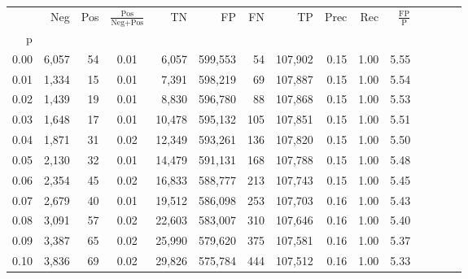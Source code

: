 \begin{tabular}{rrrcrrrrrrrrrrr}
\toprule
{} &     Neg &    Pos & $\frac{\text{Pos}}{\text{Neg}+\text{Pos}}$ &       TN &       FP &       FN &       TP &  Prec &   Rec & $\frac{\text{FP}}{\text{P}}$ \\
p    &         &        &                                            &          &          &          &          &       &       &                              \\
\midrule
0.00 &   6,057 &     54 &                                       0.01 &    6,057 &  599,553 &       54 &  107,902 &  0.15 &  1.00 &                         5.55 \\
0.01 &   1,334 &     15 &                                       0.01 &    7,391 &  598,219 &       69 &  107,887 &  0.15 &  1.00 &                         5.54 \\
0.02 &   1,439 &     19 &                                       0.01 &    8,830 &  596,780 &       88 &  107,868 &  0.15 &  1.00 &                         5.53 \\
0.03 &   1,648 &     17 &                                       0.01 &   10,478 &  595,132 &      105 &  107,851 &  0.15 &  1.00 &                         5.51 \\
0.04 &   1,871 &     31 &                                       0.02 &   12,349 &  593,261 &      136 &  107,820 &  0.15 &  1.00 &                         5.50 \\
0.05 &   2,130 &     32 &                                       0.01 &   14,479 &  591,131 &      168 &  107,788 &  0.15 &  1.00 &                         5.48 \\
0.06 &   2,354 &     45 &                                       0.02 &   16,833 &  588,777 &      213 &  107,743 &  0.15 &  1.00 &                         5.45 \\
0.07 &   2,679 &     40 &                                       0.01 &   19,512 &  586,098 &      253 &  107,703 &  0.16 &  1.00 &                         5.43 \\
0.08 &   3,091 &     57 &                                       0.02 &   22,603 &  583,007 &      310 &  107,646 &  0.16 &  1.00 &                         5.40 \\
0.09 &   3,387 &     65 &                                       0.02 &   25,990 &  579,620 &      375 &  107,581 &  0.16 &  1.00 &                         5.37 \\
0.10 &   3,836 &     69 &                                       0.02 &   29,826 &  575,784 &      444 &  107,512 &  0.16 &  1.00 &                         5.33 \\

\end{tabular}
